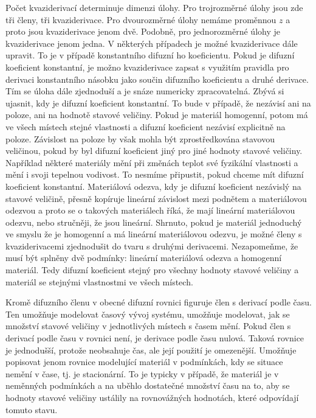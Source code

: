 \documentclass[12pt]{article}
\begin{document}
Počet kvaziderivací determinuje dimenzi úlohy. Pro trojrozměrné úlohy jsou zde tři členy, tři kvaziderivace. Pro dvourozměrné úlohy nemáme proměnnou $z$ a proto jsou kvaziderivace jenom dvě. Podobně, pro jednorozměrné úlohy je kvaziderivace jenom jedna. V některých případech je možné kvaziderivace dále upravit. To je v případě konstantního difuzní ho koeficientu. Pokud je difuzní koeficient konstantní, je možno kvaziderivace zapsat s využitím pravidla pro derivaci konstantního násobku jako součin difuzního koeficientu a druhé derivace. Tím se úloha dále zjednoduší a je snáze numericky zpracovatelná. Zbývá si ujasnit, kdy je difuzní koeficient konstantní. To bude v případě, že nezávisí ani na poloze, ani na hodnotě stavové veličiny. Pokud je materiál homogenní, potom má ve všech místech stejné vlastnosti a difuzní koeficient nezávisí explicitně na poloze. Závislost na poloze by však mohla být zprostředkována stavovou veličinou, pokud by byl difuzní koeficient jiný pro jiné hodnoty stavové veličiny. Například některé materiály mění při změnách teplot své fyzikální vlastnosti a mění i svoji tepelnou vodivost. To nesmíme připustit, pokud chceme mít difuzní koeficient konstantní. Materiálová odezva, kdy je difuzní koeficient nezávislý na stavové veličině, přesně kopíruje lineární závislost mezi podnětem a materiálovou odezvou a proto se o takových materiálech říká, že mají lineární materiálovou odezvu, nebo stručněji, že jsou lineární. Shrnuto, pokud je materiál jednoduchý ve smyslu že je homogenní a má lineární materiálovou odezvu, je možné členy s kvaziderivacemi zjednodušit do tvaru s druhými derivacemi. Nezapomeňme, že musí být splněny dvě podmínky: lineární materiálová odezva a homogenní materiál.  Tedy difuzní koeficient stejný pro všechny hodnoty stavové veličiny a materiál se stejnými vlastnostmi ve všech místech. 

Kromě difuzního členu v obecné difuzní rovnici figuruje člen s derivací podle času. Ten umožňuje modelovat časový vývoj systému, umožňuje modelovat, jak se množství stavové veličiny v jednotlivých místech s časem mění. Pokud člen s derivací podle času v rovnici není, je derivace podle času nulová. Taková rovnice je jednodušší, protože neobsahuje čas, ale její použití je omezenější. Umožňuje popisovat jenom rovnice modelující materiál v podmínkách, kdy se situace nemění v čase, tj. je stacionární. To je typicky v případě, že materiál je v neměnných podmínkách a na uběhlo dostatečné množství času na to, aby se hodnoty stavové veličiny ustálily na rovnovážných hodnotách, které odpovídají tomuto stavu.
\end{document}
